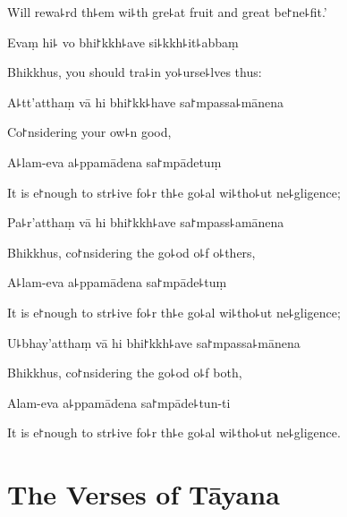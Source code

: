 \begin{english}
  Will rewa꜕rd th꜕em wi꜕th gre꜕at fruit and great be꜓ne꜕fit.'
\end{english}

Evaṃ hi꜕ vo bhi꜓kkh꜕ave si꜕kkh꜕it꜕abbaṃ

\begin{english}
  Bhikkhus, you should tra꜕in yo꜕urse꜕lves thus:
\end{english}

A꜕tt'atthaṃ vā hi bhi꜓kk꜕have sa꜓mpassa꜕mānena

\begin{english}
  Co꜓nsidering your ow꜕n good,
\end{english}

A꜕lam-eva a꜕ppamādena sa꜓mpādetuṃ

\begin{english}
  It is e꜓nough to str꜕ive fo꜕r th꜕e go꜕al wi꜕tho꜕ut ne꜕gligence;
\end{english}

Pa꜕r'atthaṃ vā hi bhi꜓kkh꜕ave sa꜓mpass꜕amānena

\begin{english}
  Bhikkhus, co꜓nsidering the go꜕od o꜕f o꜕thers,
\end{english}

A꜕lam-eva a꜕ppamādena sa꜓mpāde꜕tuṃ

\begin{english}
  It is e꜓nough to str꜕ive fo꜕r th꜕e go꜕al wi꜕tho꜕ut ne꜕gligence;
\end{english}

U꜕bhay'atthaṃ vā hi bhi꜓kkh꜕ave sa꜓mpassa꜕mānena

\begin{english}
  Bhikkhus, co꜓nsidering the go꜕od o꜕f both,
\end{english}

Alam-eva a꜕ppamādena sa꜓mpāde꜕tun-ti

\begin{english}
  It is e꜓nough to str꜕ive fo꜕r th꜕e go꜕al wi꜕tho꜕ut ne꜕gligence.
\end{english}

\chapter{The Verses of Tāyana}%

\begin{leader}
\end{leader}

